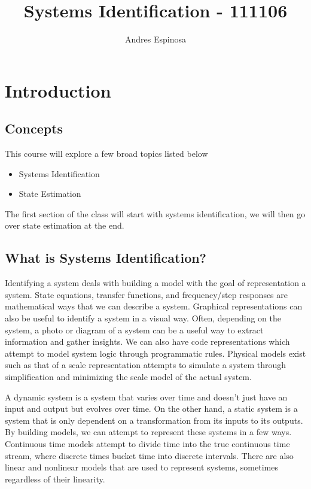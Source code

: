 \documentclass[11pt]{article}
\title{Systems Identification - 111106}
\author{Andres Espinosa}
\begin{document}
\pgfplotsset{compat=1.18}
\maketitle

\tableofcontents

\section{Introduction}
\subsection{Concepts}
This course will explore a few broad topics listed below
\begin{itemize}
    \item Systems Identification
    \item State Estimation
\end{itemize}
The first section of the class will start with systems identification, we will then go over state estimation at the end.

\subsection{What is Systems Identification?}
Identifying a system deals with building a model with the goal of representation a system.
State equations, transfer functions, and frequency/step responses are mathematical ways that we can describe a system.
Graphical representations can also be useful to identify a system in a visual way.
Often, depending on the system, a photo or diagram of a system can be a useful way to extract information and gather insights.
We can also have code representations which attempt to model system logic through programmatic rules.
Physical models exist such as that of a scale representation attempts to simulate a system through simplification and minimizing the scale model of the actual system.

A dynamic system is a system that varies over time and doesn't just have an input and output but evolves over time.
On the other hand, a static system is a system that is only dependent on a transformation from its inputs to its outputs.
By building models, we can attempt to represent these systems in a few ways.
Continuous time models attempt to divide time into the true continuous time stream, where discrete times bucket time into discrete intervals.
There are also linear and nonlinear models that are used to represent systems, sometimes regardless of their linearity.
\end{document}
